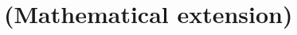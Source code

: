 \documentclass[12pt,twoside]{report}
\begin{document}
%     
    
%     
    
    
    

    \appendix
    \chapter{(Mathematical extension)}
    
    
    
\end{document}
